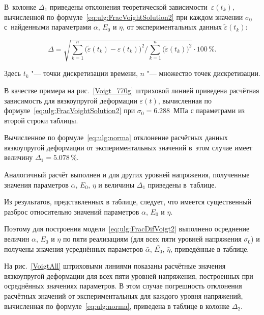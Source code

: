 В~колонке $\Delta_{1}$ приведены отклонения теоретической зависимости~$\varepsilon(t_{k})$, вычисленной  по формуле~\eqref{eq:ulg:FracVoightSolution2} при каждом значении $\sigma_{0}$ с~найденными параметрами $\alpha$, $E_{0}$ и $\eta$, от  экспериментальных данных $\tilde{\varepsilon}(t_{k})$: 

\begin{equation}\label{eq:ulg:norma}

\Delta=\sqrt{\displaystyle\sum^{n}_{k=1}\bigl(\tilde{\varepsilon}(t_{k})-\varepsilon(t_{k})\bigr)^{2}/\displaystyle\sum^{n}_{k=1}\bigl(\tilde{\varepsilon}(t_{k})\bigr)^{2}}\cdot 100\,\%.

\end{equation}

Здесь $t_{k}$ "---  точки дискретизации времени, $n$ "---  множество точек дискретизации.



В качестве примера на рис.~\ref{Voigt_770g} штриховой линией приведена расчётная зависимость для вязкоупругой деформации $\varepsilon(t)$, вычисленная по формуле~\eqref{eq:ulg:FracVoightSolution2} при $\sigma_{0}=6.288$~МПа с параметрами из второй строки таблицы. 

Вычисленное по формуле~\eqref{eq:ulg:norma} отклонение расчётных данных вязкоупругой деформации  от экспериментальных значений в~этом случае имеет величину $\Delta_{1}=5.078\,\%$. 

Аналогичный расчёт выполнен и для других уровней напряжения, полученные значения параметров $\alpha$, $E_{0}$,  $\eta$ и величины $\Delta_{1}$ приведены в~таблице.



Из результатов, представленных в таблице, следует, что имеется существенный разброс относительно значений параметров $\alpha$, $E_{0}$ и $\eta$. 

Поэтому для построения модели~\eqref{eq:ulg:FracDifVoigt2} выполнено осреднение величин $\alpha$, $E_{0}$ и $\eta$ по пяти реализациям (для всех пяти уровней напряжения $\sigma_{0}$) и получены значения усреднённых параметров $\bar{\alpha}$, $\bar{E_{0}}$, $\bar{\eta}$, приведённые в таблице.

 

На рис.~\ref{VoigtAll} штриховыми линиями показаны расчётные значения вязкоупругой деформации для всех пяти уровней напряжения, построенных при осреднённых значениях параметров. В этом случае погрешность отклонения расчётных значений от экспериментальных для каждого уровня напряжений, вычисленная по формуле~\eqref{eq:ulg:norma}, приведена в таблице в колонке  $\Delta_{2}$. 

